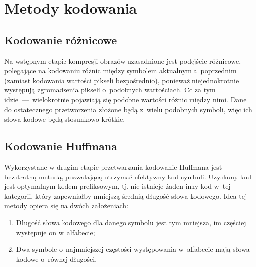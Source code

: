 \section{Metody kodowania}
\label{sec:metody}



\subsection{Kodowanie różnicowe}
\label{subsec:kodowanie_roznicowe}

Na wstępnym etapie kompresji obrazów uzasadnione jest podejście różnicowe, polegające na kodowaniu różnic między symbolem aktualnym a~poprzednim (zamiast kodowania wartości pikseli bezpośrednio), ponieważ niejednokrotnie występują zgromadzenia pikseli o~podobnych wartościach. Co za tym idzie~---~wielokrotnie pojawiają się podobne wartości różnic między nimi. Dane do ostatecznego przetworzenia złożone będą z~wielu podobnych symboli, więc ich słowa kodowe będą stosunkowo krótkie.

\subsection{Kodowanie  Huffmana}
\label{subsec:kod_huffamana}

Wykorzystane w drugim etapie przetwarzania kodowanie Huffmana jest bezstratną metodą, pozwalającą otrzymać efektywny kod symboli. Uzyskany kod jest optymalnym kodem prefiksowym, tj. nie istnieje żaden inny kod w~tej kategorii, który zapewniałby mniejszą średnią długość słowa kodowego. Idea tej metody opiera się na dwóch założeniach:

\begin{enumerate} \itemsep1pt
	\item Długość słowa kodowego dla danego symbolu jest tym mniejsza, im częściej występuje on w~alfabecie;
	\item Dwa symbole o~najmniejszej częstości występowania w~alfabecie mają słowa kodowe o~równej długości.
\end{enumerate}

